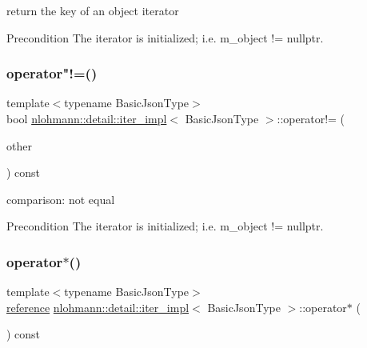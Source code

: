 return the key of an object iterator 

\begin{DoxyPrecond}{Precondition}
The iterator is initialized; i.\+e. {\ttfamily m\+\_\+object != nullptr}. 
\end{DoxyPrecond}
\mbox{\label{classnlohmann_1_1detail_1_1iter__impl_aeab0e2b5da70b3bdebecd5b1a6ee66a6}} 
\subsubsection{\texorpdfstring{operator"!=()}{operator!=()}}
{\footnotesize\ttfamily template$<$typename Basic\+Json\+Type$>$ \\
bool \hyperlink{classnlohmann_1_1detail_1_1iter__impl}{nlohmann\+::detail\+::iter\+\_\+impl}$<$ Basic\+Json\+Type $>$\+::operator!= (\begin{DoxyParamCaption}\item[{const \hyperlink{classnlohmann_1_1detail_1_1iter__impl}{iter\+\_\+impl}$<$ Basic\+Json\+Type $>$ \&}]{other }\end{DoxyParamCaption}) const\hspace{0.3cm}{\ttfamily [inline]}}



comparison\+: not equal 

\begin{DoxyPrecond}{Precondition}
The iterator is initialized; i.\+e. {\ttfamily m\+\_\+object != nullptr}. 
\end{DoxyPrecond}
\mbox{\label{classnlohmann_1_1detail_1_1iter__impl_a5ca57856d9bba54a5fc51cee891de827}} 
\subsubsection{\texorpdfstring{operator$\ast$()}{operator*()}}
{\footnotesize\ttfamily template$<$typename Basic\+Json\+Type$>$ \\
\hyperlink{classnlohmann_1_1detail_1_1iter__impl_a5be8001be099c6b82310f4d387b953ce}{reference} \hyperlink{classnlohmann_1_1detail_1_1iter__impl}{nlohmann\+::detail\+::iter\+\_\+impl}$<$ Basic\+Json\+Type $>$\+::operator$\ast$ (\begin{DoxyParamCaption}{ }\end{DoxyParamCaption}) const\hspace{0.3cm}{\ttfamily [inline]}}



